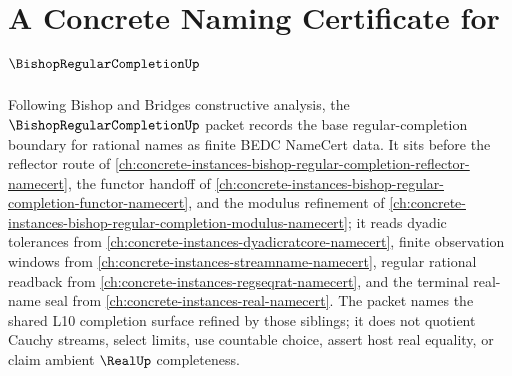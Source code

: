 \chapter{A Concrete Naming Certificate for $\BishopRegularCompletionUp$}
\label{ch:concrete-instances-bishop-regular-completion-namecert}

Following Bishop and Bridges constructive analysis, the $\BishopRegularCompletionUp$ packet records the base regular-completion boundary for rational names as finite BEDC NameCert data. It sits before the reflector route of \autoref{ch:concrete-instances-bishop-regular-completion-reflector-namecert}, the functor handoff of \autoref{ch:concrete-instances-bishop-regular-completion-functor-namecert}, and the modulus refinement of \autoref{ch:concrete-instances-bishop-regular-completion-modulus-namecert}; it reads dyadic tolerances from \autoref{ch:concrete-instances-dyadicratcore-namecert}, finite observation windows from \autoref{ch:concrete-instances-streamname-namecert}, regular rational readback from \autoref{ch:concrete-instances-regseqrat-namecert}, and the terminal real-name seal from \autoref{ch:concrete-instances-real-namecert}. The packet names the shared L10 completion surface refined by those siblings; it does not quotient Cauchy streams, select limits, use countable choice, assert host real equality, or claim ambient $\RealUp$ completeness.

